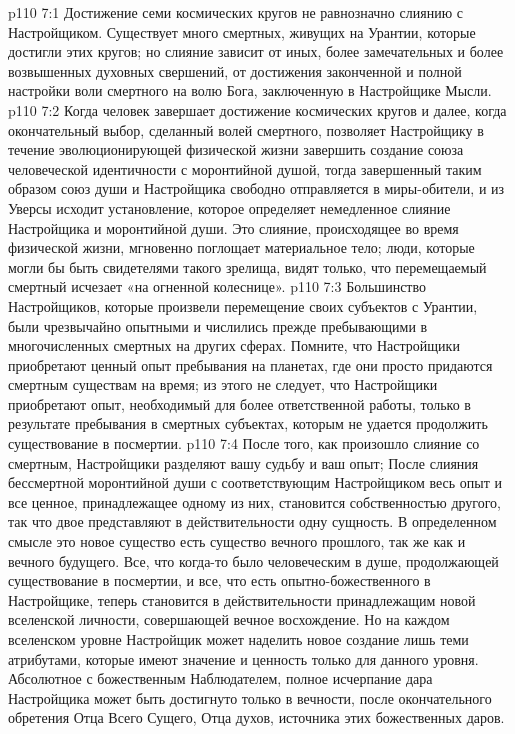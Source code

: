\vs p110 7:1 Достижение семи космических кругов не равнозначно слиянию с Настройщиком. Существует много смертных, живущих на Урантии, которые достигли этих кругов; но слияние зависит от иных, более замечательных и более возвышенных духовных свершений, от достижения законченной и полной настройки воли смертного на волю Бога, заключенную в Настройщике Мысли.
\vs p110 7:2 Когда человек завершает достижение космических кругов и далее, когда окончательный выбор, сделанный волей смертного, позволяет Настройщику в течение эволюционирующей физической жизни завершить создание союза человеческой идентичности с моронтийной душой, тогда завершенный таким образом союз души и Настройщика свободно отправляется в миры\hyp{}обители, и из Уверсы исходит установление, которое определяет немедленное слияние Настройщика и моронтийной души. Это слияние, происходящее во время физической жизни, мгновенно поглощает материальное тело; люди, которые могли бы быть свидетелями такого зрелища, видят только, что перемещаемый смертный исчезает «на огненной колеснице».
\vs p110 7:3 Большинство Настройщиков, которые произвели перемещение своих субъектов с Урантии, были чрезвычайно опытными и числились прежде пребывающими в многочисленных смертных на других сферах. Помните, что Настройщики приобретают ценный опыт пребывания на планетах, где они просто придаются смертным существам на время; из этого не следует, что Настройщики приобретают опыт, необходимый для более ответственной работы, только в результате пребывания в смертных субъектах, которым не удается продолжить существование в посмертии.
\vs p110 7:4 \pc После того, как произошло слияние со смертным, Настройщики разделяют вашу судьбу и ваш опыт;  После слияния бессмертной моронтийной души с соответствующим Настройщиком весь опыт и все ценное, принадлежащее одному из них, становится собственностью другого, так что двое представляют в действительности одну сущность. В определенном смысле это новое существо есть существо вечного прошлого, так же как и вечного будущего. Все, что когда\hyp{}то было человеческим в душе, продолжающей существование в посмертии, и все, что есть опытно\hyp{}божественного в Настройщике, теперь становится в действительности принадлежащим новой вселенской личности, совершающей вечное восхождение. Но на каждом вселенском уровне Настройщик может наделить новое создание лишь теми атрибутами, которые имеют значение и ценность только для данного уровня. Абсолютное  с божественным Наблюдателем, полное исчерпание дара Настройщика может быть достигнуто только в вечности, после окончательного обретения Отца Всего Сущего, Отца духов, источника этих божественных даров.
